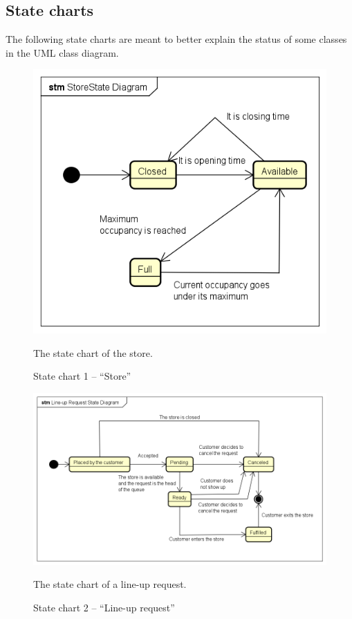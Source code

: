 \documentclass[a4paper,oneside,11pt]{book}   %
\newcommand{\captionrasd}[2]{\caption{#1}\par\begin{center}\vspace{-.01\textheight}\small#2.\end{center}}
\begin{document}
    \subsection{State charts}
    The following state charts are meant to better explain the status of some classes in the UML class diagram.
    \begin{figure}[H]
        \centering
        \includegraphics[width=.6\textwidth, keepaspectratio]{pictures/state_diagrams/store}
        \captionrasd{State chart 1 -- ``Store''}{The state chart of the store}
        \label{figure:state_chart_1_store}
    \end{figure}
    \begin{figure}[H]
        \centering
        \includegraphics[width=.85\textwidth, keepaspectratio]{pictures/state_diagrams/line-up_request}
        \captionrasd{State chart 2 -- ``Line-up request''}{The state chart of a line-up request}
        \label{figure:state_chart_2_lineup_request}
    \end{figure}
\end{document}
